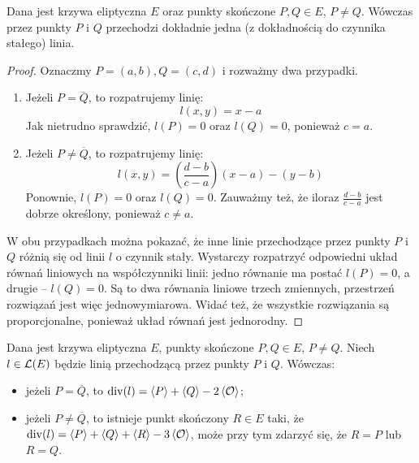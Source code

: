 \begin{theorem}\label{line_through_two_points_theorem}
Dana jest krzywa eliptyczna $E$
oraz punkty skończone $P, Q \in E$, $P \neq Q$.
Wówczas przez punkty $P$ i $Q$
przechodzi dokładnie jedna (z dokładnością do czynnika stałego) linia.
\end{theorem}

\begin{proof}
Oznaczmy $P = (a, b), Q = (c, d)$ i rozważmy dwa przypadki.
\begin{enumerate}
\item
Jeżeli $P = \overline{Q}$,
to rozpatrujemy linię:
\begin{equation}
l(x, y) = x - a
\end{equation}
Jak nietrudno sprawdzić, $l(P) = 0$ oraz $l(Q) = 0$,
ponieważ $c = a$.
\item
Jeżeli $P \neq \overline{Q}$,
to rozpatrujemy linię:
\begin{equation}
l(x, y) = \left(\frac{d-b}{c-a}\right)(x - a) - (y - b)
\end{equation}
Ponownie, $l(P) = 0$ oraz $l(Q) = 0$.
Zauważmy też,
że iloraz $\frac{d-b}{c-a}$ jest dobrze określony,
ponieważ $c \neq a$.
\end{enumerate}

W obu przypadkach można pokazać, że inne linie
przechodzące przez punkty $P$ i $Q$ różnią się od linii $l$ o czynnik stały.
Wystarczy rozpatrzyć odpowiedni układ równań liniowych
na współczynniki linii:
jedno równanie ma postać $l(P) = 0$, a drugie -- $l(Q) = 0$.
Są to dwa równania liniowe trzech zmiennych,
przestrzeń rozwiązań jest więc jednowymiarowa.
Widać też, że wszystkie rozwiązania są proporcjonalne,
ponieważ układ równań jest jednorodny.
\end{proof}

\begin{theorem}
Dana jest krzywa eliptyczna $E$,
punkty skończone $P, Q \in E$, $P \neq Q$.
Niech $l \in \mathcal{L}(E)$ będzie linią przechodzącą przez punkty $P$ i $Q$.
Wówczas:
\begin{itemize}
\item jeżeli $P = \overline{Q}$,
to $\operatorname{div}(l) = \left\langle P\right\rangle + \left\langle Q\right\rangle - 2\left\langle\mathcal{O}\right\rangle$;
\item jeżeli $P \neq \overline{Q}$,
to istnieje punkt skończony $R \in E$ taki,
że $\operatorname{div}(l) = \left\langle P\right\rangle + \left\langle Q\right\rangle + \left\langle R\right\rangle - 3\left\langle\mathcal{O}\right\rangle$,
może przy tym zdarzyć się, że $R = P$ lub $R = Q$.
\end{itemize}
\end{theorem}


